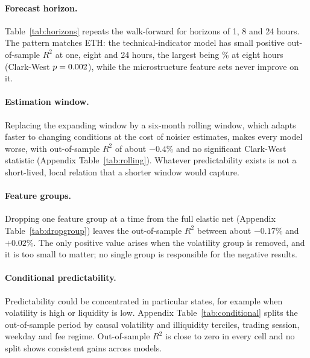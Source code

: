 \begin{table}[t]
\centering\caption{Stability of the return response to observed flow}\label{tab:response_splits}
\resizebox{\textwidth}{!}{}
\end{table}

\paragraph{Forecast horizon.} Table~\ref{tab:horizons} repeats the walk-forward for horizons of
1, 8 and 24 hours. The pattern matches ETH: the technical-indicator model has small positive
out-of-sample $R^2$ at one, eight and 24 hours, the largest being \BTChzTIeight\% at eight hours
(Clark-West $p=0.002$), while the microstructure feature sets never improve on it.

\begin{table}[t]
\centering\caption{Forecast horizon, BTC/USDT}\label{tab:horizons}

\end{table}

\paragraph{Estimation window.} Replacing the expanding window by a six-month rolling window, which
adapts faster to changing conditions at the cost of noisier estimates, makes every model worse,
with out-of-sample $R^2$ of about $-0.4\%$ and no significant Clark-West statistic (Appendix
Table~\ref{tab:rolling}). Whatever predictability exists is not a short-lived, local relation that a
shorter window would capture.

\paragraph{Feature groups.} Dropping one feature group at a time from the full elastic net
(Appendix Table~\ref{tab:dropgroup}) leaves the out-of-sample $R^2$ between about $-0.17\%$ and
$+0.02\%$. The only positive value arises when the volatility group is removed, and it is too small
to matter; no single group is responsible for the negative results.

\paragraph{Conditional predictability.} Predictability could be concentrated in particular states,
for example when volatility is high or liquidity is low. Appendix Table~\ref{tab:conditional} splits
the out-of-sample period by causal volatility and illiquidity terciles, trading session, weekday and
fee regime. Out-of-sample $R^2$ is close to zero in every cell and no split shows consistent gains
across models.
